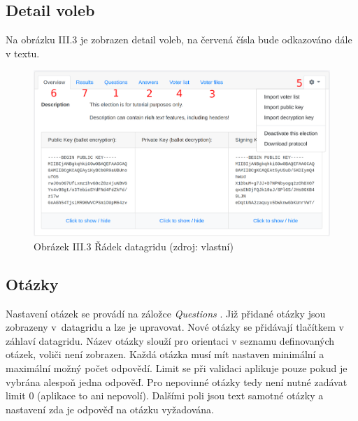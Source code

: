 \subsection*{Detail voleb}
Na obrázku III.3 je zobrazen detail voleb, na červená čísla bude odkazováno dále v textu.
\begin{figure}[h]
	\centering
	\includegraphics[width=\linewidth]{graphics/attachements/noveVolbyDetail.png}
	\captionsetup{width=\linewidth}
	\caption*{Obrázek III.3 Řádek datagridu (zdroj: vlastní)}
\end{figure}

\subsection*{Otázky}
Nastavení otázek se provádí na záložce \textit{Questions} \;. Již přidané otázky jsou zobrazeny v~datagridu a lze je upravovat. Nové otázky se přidávají tlačítkem v záhlaví datagridu. Název otázky slouží pro orientaci v seznamu definovaných otázek, voliči není zobrazen. Každá otázka musí mít nastaven minimální a maximální možný počet odpovědí. Limit se při validaci aplikuje pouze pokud je vybrána alespoň jedna odpověď. Pro nepovinné otázky tedy není nutné zadávat limit 0 (aplikace to ani nepovolí). Dalšími poli jsou text samotné otázky a nastavení zda je odpověď na otázku vyžadována. 

